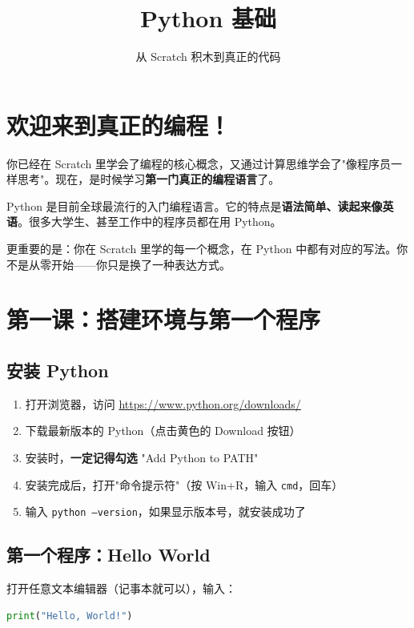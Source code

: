 \documentclass[a4paper,12pt]{ctexart}
\title{\textcolor{blue!70!black}{\Huge\textbf{Python 基础}}}
\author{从 Scratch 积木到真正的代码}
\date{}
\begin{document}
\maketitle
\thispagestyle{empty}

\section*{欢迎来到真正的编程！}

你已经在 Scratch 里学会了编程的核心概念，又通过计算思维学会了"像程序员一样思考"。现在，是时候学习\textbf{第一门真正的编程语言}了。

Python 是目前全球最流行的入门编程语言。它的特点是\textbf{语法简单、读起来像英语}。很多大学生、甚至工作中的程序员都在用 Python。

更重要的是：你在 Scratch 里学的每一个概念，在 Python 中都有对应的写法。你不是从零开始——你只是换了一种表达方式。

\section*{第一课：搭建环境与第一个程序}

\subsection*{安装 Python}

\begin{enumerate}
  \item 打开浏览器，访问 \url{https://www.python.org/downloads/}
  \item 下载最新版本的 Python（点击黄色的 Download 按钮）
  \item 安装时，\textbf{一定记得勾选} "Add Python to PATH"
  \item 安装完成后，打开"命令提示符"（按 Win+R，输入 \texttt{cmd}，回车）
  \item 输入 \texttt{python --version}，如果显示版本号，就安装成功了
\end{enumerate}

\subsection*{第一个程序：Hello World}

打开任意文本编辑器（记事本就可以），输入：

\begin{lstlisting}[language=Python]
print("Hello, World!")
\end{lstlisting}
\end{document}

